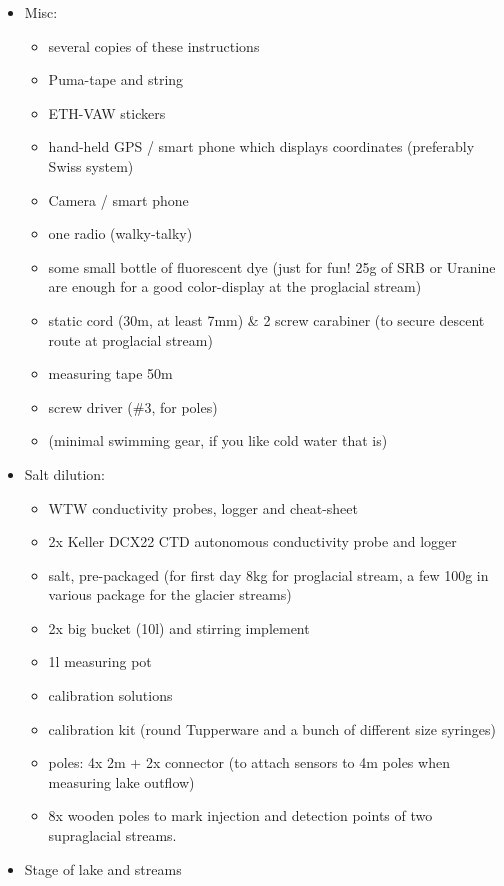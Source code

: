 \documentclass[DIV=15,halfparskip,11pt,headinclude]{scrartcl}
\begin{document}
\begin{itemize}
\item Misc:
  \begin{itemize}
  \item several copies of these instructions
  \item Puma-tape and string
  \item ETH-VAW stickers
  \item hand-held GPS / smart phone which displays coordinates
    (preferably Swiss system)
  \item Camera / smart phone
  \item one radio (walky-talky)
  \item some small bottle of fluorescent dye (just for fun! 25g of SRB
    or Uranine are enough for a good color-display at the proglacial
    stream)
  \item static cord (30m, at least 7mm) \& 2 screw carabiner (to secure descent route at
    proglacial stream)
  \item measuring tape 50m
  \item screw driver (\#3, for poles)
  \item (minimal swimming gear, if you like cold water that is)
  \end{itemize}
\item Salt dilution:
  \begin{itemize}
  \item WTW conductivity probes, logger and cheat-sheet
  \item 2x Keller DCX22 CTD autonomous conductivity probe and logger
  \item salt, pre-packaged (for first day 8kg for proglacial stream, a
    few 100g in various package for the glacier streams)
  \item 2x big bucket (10l) and stirring implement
  \item 1l measuring pot
  \item calibration solutions
  \item calibration kit (round Tupperware and a bunch of different size syringes)
  \item poles: 4x 2m + 2x connector (to attach sensors to 4m poles when measuring
    lake outflow)
  \item 8x wooden poles to mark injection and
    detection points of two supraglacial streams.
  \end{itemize}
\item Stage of lake and streams
  \begin{itemize}

\end{itemize}
\end{itemize}
\end{document}
